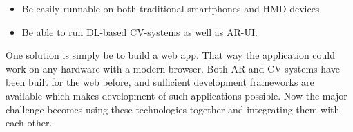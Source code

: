 \begin{itemize}
	\item Be easily runnable on both traditional smartphones and HMD-devices
	\item Be able to run DL-based CV-systems as well as AR-UI.
\end{itemize}
\par 
	One solution is simply be to build a web app. That way the 
application could work on any hardware with a modern browser. Both 
AR\cite{chen2022} and CV-systems\cite{tfWeb} have been built for the web 
before, and sufficient development frameworks are available which makes 
development of such applications possible. Now the major challenge becomes 
using these technologies together and integrating them with each other.






